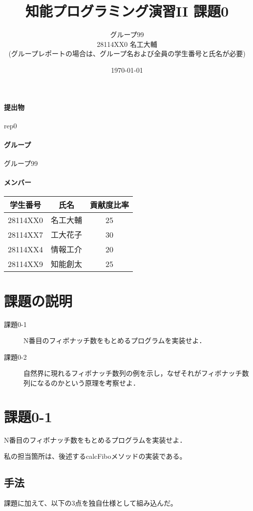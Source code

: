 \documentclass[a4j]{jarticle}
\title{知能プログラミング演習II 課題0}
\author{グループ99\\
  28114XX0 名工大輔\\
  {\small (グループレポートの場合は、グループ名および全員の学生番号と氏名が必要)}
}
\date{\today}
\begin{document}
\maketitle

\paragraph{提出物} rep0
\paragraph{グループ} グループ99
\paragraph{メンバー}
\begin{tabular}{|c|c|c|}
  \hline
  学生番号&氏名&貢献度比率\\
  \hline\hline
  28114XX0&名工大輔&25\\
  \hline
  28114XX7&工大花子&30\\
  \hline
  28114XX4&情報工介&20\\
  \hline
  28114XX9&知能創太&25\\
  \hline
\end{tabular}



\section{課題の説明}
\begin{description}
\item[課題0-1] N番目のフィボナッチ数をもとめるプログラムを実装せよ．
\item[課題0-2] 自然界に現れるフィボナッチ数列の例を示し，なぜそれがフィボナッチ数列になるのかという原理を考察せよ．
\end{description}


\section{課題0-1}
\begin{screen}
  N番目のフィボナッチ数をもとめるプログラムを実装せよ．
\end{screen}

私の担当箇所は、後述するcalcFiboメソッドの実装である。
\subsection{手法}
課題に加えて、以下の3点を独自仕様として組み込んだ。
\end{document}
